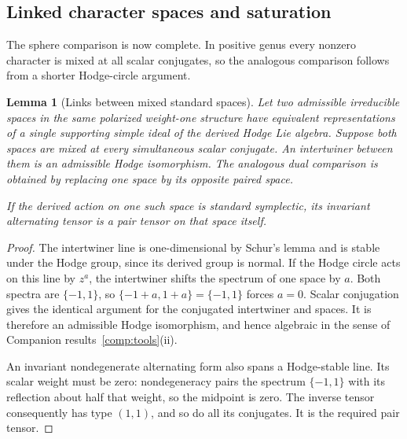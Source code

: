 \documentclass[11pt]{article}
\theoremstyle{plain}
\newtheorem{lemma}[theorem]{Lemma}
\theoremstyle{definition}
\theoremstyle{remark}
\numberwithin{equation}{section}
\begin{document}
\subsection{Linked character spaces and saturation}

The sphere comparison is now complete.  In positive genus every
nonzero character is mixed at all scalar conjugates, so the analogous
comparison follows from a shorter Hodge-circle argument.

\begin{lemma}[Links between mixed standard spaces]\label{p4:mixed-links}
Let two admissible irreducible spaces in the same polarized weight-one
structure have equivalent representations of a single supporting simple
ideal of the derived Hodge Lie algebra.  Suppose both spaces are mixed
at every simultaneous scalar conjugate.  An intertwiner between them
is an admissible Hodge isomorphism.  The analogous dual comparison is
obtained by replacing one space by its opposite paired space.

If the derived action on one such space is standard symplectic, its
invariant alternating tensor is a pair tensor on that space itself.
\end{lemma}

\begin{proof}
The intertwiner line is one-dimensional by Schur's lemma and is stable
under the Hodge group, since its derived group is normal.  If the Hodge
circle acts on this line by $z^a$, the intertwiner shifts the spectrum
of one space by $a$.  Both spectra are $\{-1,1\}$, so
$\{-1+a,1+a\}=\{-1,1\}$ forces $a=0$.  Scalar conjugation gives
the identical argument for the conjugated intertwiner and spaces.
It is therefore an admissible Hodge isomorphism, and hence algebraic
in the sense of Companion results~\ref{comp:tools}\textup{(ii)}.

An invariant nondegenerate alternating form also spans a Hodge-stable
line.  Its scalar weight must be zero: nondegeneracy pairs the spectrum
$\{-1,1\}$ with its reflection about half that weight, so the midpoint
is zero.  The inverse tensor consequently has type $(1,1)$, and so do
all its conjugates.  It is the required pair tensor.
\end{proof}
\end{document}
